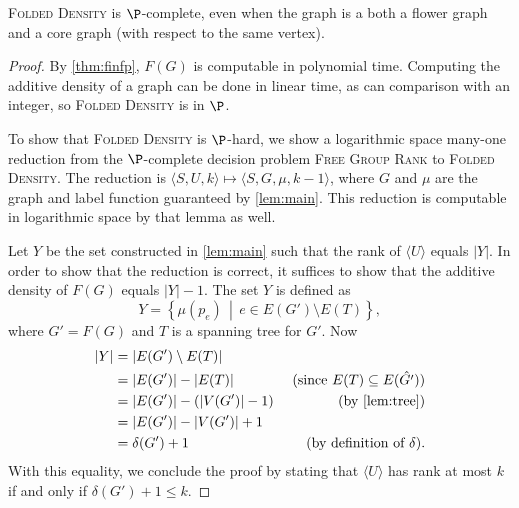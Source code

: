 \documentclass{article}
\newcommand{\FGR}{\textsc{Free Group Rank}}
\newcommand{\FD}{\textsc{Folded Density}}
\newcommand{\gen}[1]{\langle #1 \rangle}
\begin{document}
\begin{theorem}\label{thm:fdpcomplete}
  \FD{} is $\P$-complete, even when the graph is a both a flower graph and a core graph (with respect to the same vertex).
\end{theorem}
\begin{proof}
  By \autoref{thm:finfp}, $F(G)$ is computable in polynomial time.
  Computing the additive density of a graph can be done in linear time, as can comparison with an integer, so \FD{} is in $\P$.

  To show that \FD{} is $\P$-hard, we show a logarithmic space many-one reduction from the $\P$-complete decision problem \FGR{} to \FD{}.
  The reduction is $\langle S, U, k \rangle \mapsto \langle S, G, \mu, k - 1 \rangle$, where $G$ and $\mu$ are the graph and label function guaranteed by \autoref{lem:main}.
  This reduction is computable in logarithmic space by that lemma as well.

  Let $Y$ be the set constructed in \autoref{lem:main} such that the rank of $\gen{U}$ equals $|Y|$.
  In order to show that the reduction is correct, it suffices to show that the additive density of $F(G)$ equals $|Y| - 1$.
  The set $Y$ is defined as
  \begin{equation*}
    Y = \left\{\mu(p_e) \, \middle| \, e \in E(G') \setminus E(T) \right\},
  \end{equation*}
  where $G' = F(G)$ and $T$ is a spanning tree for $G'$.
  Now
  \begin{align*}
    |Y| & = |E(G') \setminus E(T)| & \\
    & = |E(G')| - |E(T)| & \text{ (since } E(T) \subseteq E(\hat{G'}) \text{)} \\
    & = |E(G')| - (|V(G')| - 1) & \text{ (by \autoref{lem:tree})} \\
    & = |E(G')| - |V(G')| + 1 & \\
    & = \delta(G') + 1 & \text{ (by definition of } \delta \text{)}.
  \end{align*}
  With this equality, we conclude the proof by stating that $\gen{U}$ has rank at most $k$ if and only if $\delta(G') + 1 \leq k$.
\end{proof}
\end{document}
